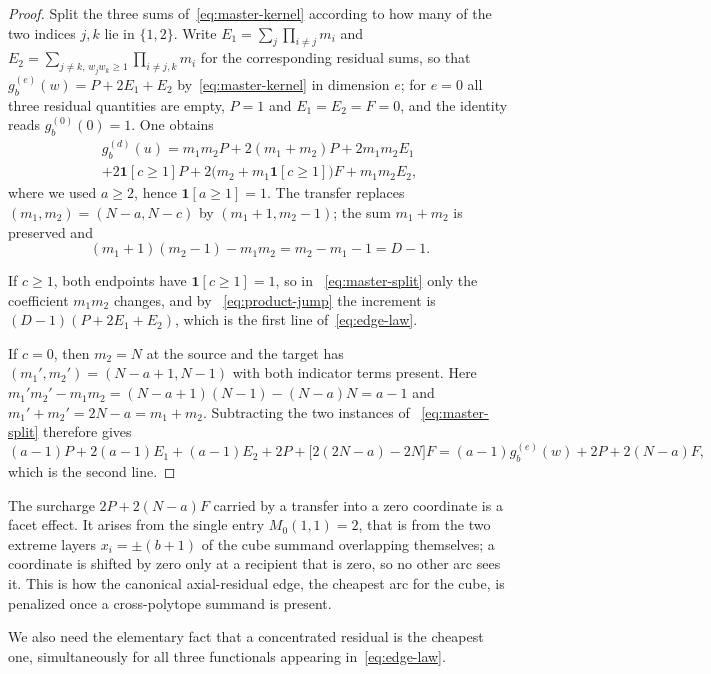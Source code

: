 \documentclass[pdflatex,sn-mathphys-num]{sn-jnl}
\theoremstyle{thmstyleone}
\theoremstyle{thmstylethree}
\theoremstyle{thmstyletwo}
\begin{document}
\begin{proof}
Split the three sums of~\eqref{eq:master-kernel} according to how many of the
two indices $j,k$ lie in $\{1,2\}$.  Write $E_1=\sum_{j}\prod_{i\ne j}m_i$
and $E_2=\sum_{j\ne k,\,w_jw_k\ge1}\prod_{i\ne j,k}m_i$ for the
corresponding residual sums, so that $g_b^{(e)}(w)=P+2E_1+E_2$
by~\eqref{eq:master-kernel} in dimension $e$; for $e=0$ all three residual
quantities are empty, $P=1$ and $E_1=E_2=F=0$, and the identity reads
$g_b^{(0)}(0)=1$.  One obtains
\begin{multline}
 g_b^{(d)}(u)=m_1m_2P+2(m_1+m_2)P+2m_1m_2E_1\\
 +2\mathbf 1[c\ge1]P
 +2\bigl(m_2+m_1\mathbf 1[c\ge1]\bigr)F+m_1m_2E_2,
 \label{eq:master-split}
\end{multline}
where we used $a\ge2$, hence $\mathbf 1[a\ge1]=1$.  The transfer replaces
$(m_1,m_2)=(N-a,N-c)$ by $(m_1+1,m_2-1)$; the sum $m_1+m_2$ is preserved and
\begin{equation}
 (m_1+1)(m_2-1)-m_1m_2=m_2-m_1-1=D-1.
 \label{eq:product-jump}
\end{equation}

If $c\ge1$, both endpoints have $\mathbf 1[c\ge1]=1$, so in
~\eqref{eq:master-split} only the coefficient $m_1m_2$ changes, and by
~\eqref{eq:product-jump} the increment is $(D-1)(P+2E_1+E_2)$, which is the
first line of~\eqref{eq:edge-law}.

If $c=0$, then $m_2=N$ at the source and the target has
$(m_1',m_2')=(N-a+1,N-1)$ with both indicator terms present.  Here
$m_1'm_2'-m_1m_2=(N-a+1)(N-1)-(N-a)N=a-1$ and
$m_1'+m_2'=2N-a=m_1+m_2$.  Subtracting the two instances of
~\eqref{eq:master-split} therefore gives
\[
 (a-1)P+2(a-1)E_1+(a-1)E_2
 +2P+\bigl[2(2N-a)-2N\bigr]F
 =(a-1)g_b^{(e)}(w)+2P+2(N-a)F,
\]
which is the second line.
\end{proof}

The surcharge $2P+2(N-a)F$ carried by a transfer into a zero coordinate is a
facet effect.  It arises from the single entry $M_0(1,1)=2$, that is from the
two extreme layers $x_i=\pm(b+1)$ of the cube summand overlapping
themselves; a coordinate is shifted by zero only at a recipient that is
zero, so no other arc sees it.  This is how the canonical axial-residual
edge, the cheapest arc for the cube, is penalized once a cross-polytope
summand is present.

We also need the elementary fact that a concentrated residual is the cheapest
one, simultaneously for all three functionals appearing
in~\eqref{eq:edge-law}.
\end{document}
